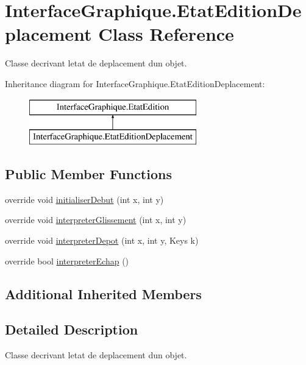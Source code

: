 \hypertarget{class_interface_graphique_1_1_etat_edition_deplacement}{}\section{Interface\+Graphique.\+Etat\+Edition\+Deplacement Class Reference}
\label{class_interface_graphique_1_1_etat_edition_deplacement}


Classe decrivant l\textquotesingle{}etat de deplacement d\textquotesingle{}un objet.  


Inheritance diagram for Interface\+Graphique.\+Etat\+Edition\+Deplacement\+:\begin{figure}[H]
\begin{center}
\leavevmode
\includegraphics[height=2.000000cm]{class_interface_graphique_1_1_etat_edition_deplacement}
\end{center}
\end{figure}
\subsection*{Public Member Functions}
\begin{DoxyCompactItemize}
\item 
override void \hyperlink{group__inf2990_gabc8016b3e2aa3cb05ab7ed46e09f9756}{initialiser\+Debut} (int x, int y)
\item 
override void \hyperlink{group__inf2990_ga7a539c405dacfc8c4db9236c3339ac78}{interpreter\+Glissement} (int x, int y)
\item 
override void \hyperlink{group__inf2990_gad7f3950cc5a7424a4202b13e2887ba98}{interpreter\+Depot} (int x, int y, Keys k)
\item 
override bool \hyperlink{group__inf2990_ga2429ffa3820e15904f54fdaec20a7ec6}{interpreter\+Echap} ()
\end{DoxyCompactItemize}
\subsection*{Additional Inherited Members}


\subsection{Detailed Description}
Classe decrivant l\textquotesingle{}etat de deplacement d\textquotesingle{}un objet. 

